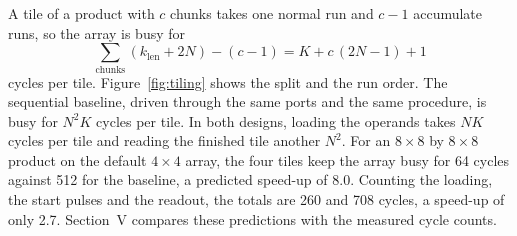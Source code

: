 A tile of a product with $c$ chunks takes one normal run and $c - 1$ accumulate runs, so the array is busy for
\begin{equation}
\sum_{\text{chunks}} \left(k_{\mathrm{len}} + 2N\right) - (c - 1) = K + c\,(2N - 1) + 1
\label{eq:tilebusy}
\end{equation}
cycles per tile. Figure~\ref{fig:tiling} shows the split and the run order. The sequential baseline, driven through the same ports and the same procedure, is busy for $N^2 K$ cycles per tile. In both designs, loading the operands takes $NK$ cycles per tile and reading the finished tile another $N^2$. For an $8 \times 8$ by $8 \times 8$ product on the default $4 \times 4$ array, the four tiles keep the array busy for 64 cycles against 512 for the baseline, a predicted speed-up of 8.0. Counting the loading, the start pulses and the readout, the totals are 260 and 708 cycles, a speed-up of only 2.7. Section~V compares these predictions with the measured cycle counts.
